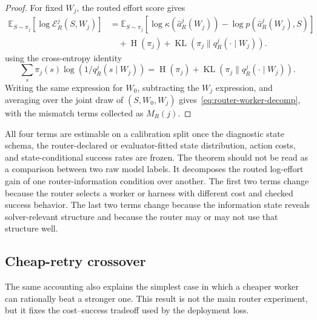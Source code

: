\documentclass{article}
\DeclareMathOperator{\KL}{KL}
\DeclareMathOperator{\Hent}{H}
\newcommand{\E}{\mathbb{E}}
\begin{document}
\begin{proof}
For fixed $W_j$, the routed effort score gives
\begin{align*}
\E_{S\sim\pi_j}[\log \mathcal E_R^j(S,W_j)]
&=
\E_{S\sim\pi_j}[
\log\kappa(\hat a_R^j(W_j))
-\log p(\hat a_R^j(W_j),S)]
\\
&\quad
+\Hent(\pi_j)+\KL(\pi_j\|q_R^j(\cdot\mid W_j)).
\end{align*}
using the cross-entropy identity
\[
\sum_s \pi_j(s)\log(1/q_R^j(s\mid W_j))
=
\Hent(\pi_j)+\KL(\pi_j\|q_R^j(\cdot\mid W_j)).
\]
Writing the same expression for $W_0$, subtracting the $W_j$ expression, and averaging over the joint draw of $(S,W_0,W_j)$ gives~\eqref{eq:router-worker-decomp}, with the mismatch terms collected as $M_R(j)$.
\end{proof}

All four terms are estimable on a calibration split once the diagnostic state schema, the router-declared or evaluator-fitted state distribution, action costs, and state-conditional success rates are frozen.
The theorem should not be read as a comparison between two raw model labels.
It decomposes the routed log-effort gain of one router-information condition over another.
The first two terms change because the router selects a worker or harness with different cost and checked success behavior.
The last two terms change because the information state reveals solver-relevant structure and because the router may or may not use that structure well.

\subsection{Cheap-retry crossover}

The same accounting also explains the simplest case in which a cheaper worker can rationally beat a stronger one.
This result is not the main router experiment, but it fixes the cost--success tradeoff used by the deployment loss.
\end{document}
